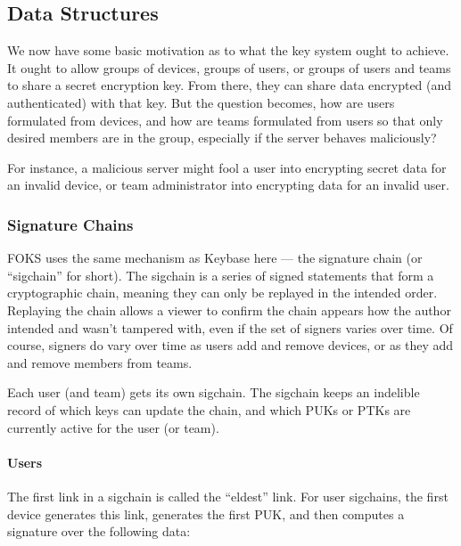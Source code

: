 \subsection{Data Structures}

We now have some basic motivation as to what the key system ought to achieve.
It ought to allow groups of devices, groups of users, or groups of users
and teams to share a secret encryption key. From there, they can share data
encrypted (and authenticated) with that key. But the question becomes,
how are users formulated from devices, and how are teams formulated from users
so that only desired members are in the group, especially if the server
behaves maliciously?

For instance, a malicious server might fool a user into encrypting secret data
for an invalid device, or team administrator into encrypting data for an invalid
user.

\subsubsection{Signature Chains}
\label{sec:sigchains}

FOKS uses the same mechanism as Keybase here --- the signature chain (or
``sigchain'' for short).  The sigchain is a series of signed statements that
form a cryptographic chain, meaning they can only be replayed in the intended
order. Replaying the chain allows a viewer to confirm the chain appears how the
author intended and wasn't tampered with, even if the set of signers varies over
time. Of course, signers do vary over time as users add and remove devices, or
as they add and remove members from teams.

Each user (and team) gets its own sigchain. The sigchain keeps an indelible record
of which keys can update the chain, and which PUKs or PTKs are currently
active for the user (or team).

\paragraph{Users} The first link in a sigchain is called the ``eldest'' link. For user sigchains,
the first device generates this link, generates the first PUK, and then computes
a signature over the following data:

